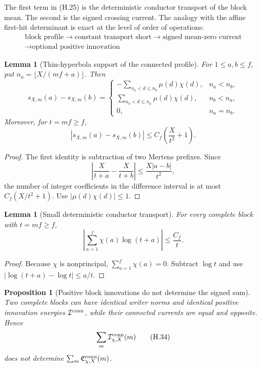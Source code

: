 \documentclass[11pt]{article}
\newtheorem{proposition}[theorem]{Proposition}
\newtheorem{lemma}[theorem]{Lemma}
\theoremstyle{definition}
\theoremstyle{remark}
\begin{document}
The first term in \textup{(H.25)} is the deterministic conductor transport
of the block mean.  The second is the signed crossing current.  The analogy
with the affine first-hit determinant is exact at the level of order of
operations:
\[
 \boxed{
 \begin{gathered}
 \text{block profile}
 \longrightarrow
 \text{constant transport short}
 \longrightarrow
 \text{signed mean-zero current}\\
 \longrightarrow
 \text{optional positive innovation}
 \end{gathered}}
 \tag{H.30}
\]

\begin{lemma}[Thin-hyperbola support of the connected profile]
\label{lem:hyperbola-thin-support}
For \(1\le a,b\le f\), put
\(n_a=\lfloor X/(mf+a)\rfloor\).  Then
\[
 \boxed{
 s_{X,m}(a)-s_{X,m}(b)
 =\begin{cases}
  -\displaystyle\sum_{n_a<d\le n_b}\mu(d)\chi(d),&n_a<n_b,\\[0.8em]
  \displaystyle\sum_{n_b<d\le n_a}\mu(d)\chi(d),&n_b<n_a,\\[0.4em]
  0,&n_a=n_b.
 \end{cases}}
 \tag{H.31}
\]
Moreover, for \(t=mf\ge f\),
\[
 \boxed{
 |s_{X,m}(a)-s_{X,m}(b)|
 \le C_f\left(\frac{X}{t^2}+1\right).}
 \tag{H.32}
\]
\end{lemma}

\begin{proof}
The first identity is subtraction of two Mertens prefixes.  Since
\[
 \left|\frac{X}{t+a}-\frac{X}{t+b}\right|
 \le\frac{X|a-b|}{t^2},
\]
the number of integer coefficients in the difference interval is at most
\(C_f(X/t^2+1)\).  Use \(|\mu(d)\chi(d)|\le1\).
\end{proof}

\begin{lemma}[Small deterministic conductor transport]
\label{lem:hyperbola-small-transport}
For every complete block with \(t=mf\ge f\),
\[
 \boxed{
 \left|\sum_{a=1}^f\chi(a)\log(t+a)\right|
 \le\frac{C_f}{t}.}
 \tag{H.33}
\]
\end{lemma}

\begin{proof}
Because \(\chi\) is nonprincipal,
\(\sum_{a=1}^f\chi(a)=0\).  Subtract \(\log t\) and use
\(|\log(t+a)-\log t|\le a/t\).
\end{proof}

\begin{proposition}[Positive block innovations do not determine the signed sum]
\label{cth:hyperbola-block-energy-no-sign}
Two complete blocks can have identical writer norms and identical positive
innovation energies \(\mathcal I^{\rm conn}\), while their connected currents
are equal and opposite.  Hence
\[
 \sum_m\mathcal I_{\chi,X}^{\rm conn}(m)
 \tag{H.34}
\]
does not determine
\(\sum_m\mathfrak C_{\chi,X}^{\rm conn}(m)\).
\end{proposition}
\end{document}
